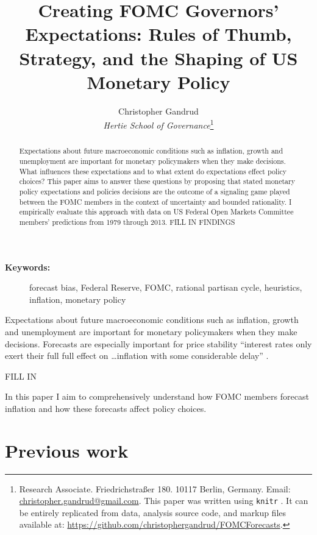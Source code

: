 \documentclass[a4paper]{article}\usepackage[]{graphicx}\usepackage[]{color}
\title{Creating FOMC Governors' Expectations: Rules of Thumb, Strategy, and the Shaping of US Monetary Policy}
\author{Christopher Gandrud \\
                {\emph{Hertie School of Governance}}\footnote{Research Associate. Friedrichstra{\ss}er 180. 10117 Berlin, Germany. Email: \href{mailto:christopher.gandrud@gmail.com}{christopher.gandrud@gmail.com}. This paper was written using {\tt{knitr}} \citep{R-knitr}. It can be entirely replicated from data, analysis source code, and markup files available at: {\url{https://github.com/christophergandrud/FOMCForecasts}}.}}
\begin{document}
\maketitle

\begin{abstract}
    Expectations about future macroeconomic conditions such as inflation, growth and unemployment are important for monetary policymakers when they make decisions. What influences these expectations and to what extent do expectations effect policy choices? This paper aims to answer these questions by proposing that stated monetary policy expectations and policies decisions are the outcome of a signaling game played between the FOMC members in the context of uncertainty and bounded rationality. I empirically evaluate this approach with data on US Federal Open Markets Committee members' predictions from 1979 through 2013. FILL IN FINDINGS
\end{abstract}

\begin{description}
  \item [{\textbf{Keywords:}}] forecast bias, Federal Reserve, FOMC, rational partisan cycle, heuristics, inflation, monetary policy
\end{description}


Expectations about future macroeconomic conditions such as inflation, growth and unemployment are important for monetary policymakers when they make decisions. Forecasts are especially important for price stability ``interest rates only exert their full full effect on \ldots inflation with some considerable delay'' \cite[59]{Goodhart2001}.

FILL IN

In this paper I aim to comprehensively understand how FOMC members forecast inflation and how these forecasts affect policy choices.

\section{Previous work}
\end{document}
